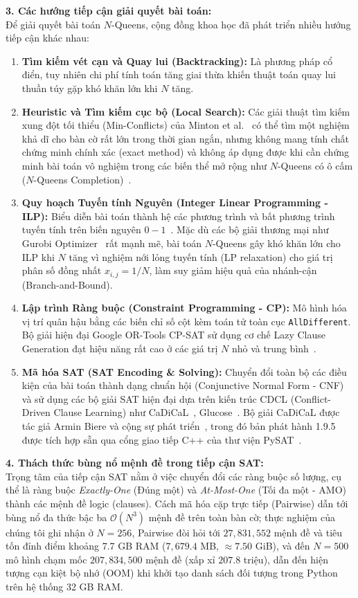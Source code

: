 \documentclass[a4paper,fleqn]{cas-sc}
\begin{document}
\noindent\textbf{3. Các hướng tiếp cận giải quyết bài toán:}\\
Để giải quyết bài toán $N$-Queens, cộng đồng khoa học đã phát triển nhiều hướng tiếp cận khác nhau:
\begin{enumerate}
    \item \textbf{Tìm kiếm vét cạn và Quay lui (Backtracking):} Là phương pháp cổ điển, tuy nhiên chi phí tính toán tăng giai thừa khiến thuật toán quay lui thuần túy gặp khó khăn lớn khi $N$ tăng.
    \item \textbf{Heuristic và Tìm kiếm cục bộ (Local Search):} Các giải thuật tìm kiếm xung đột tối thiểu (Min-Conflicts) của Minton et al.~\cite{minton1992solving} có thể tìm một nghiệm khả dĩ cho bàn cờ rất lớn trong thời gian ngắn, nhưng không mang tính chất chứng minh chính xác (exact method) và không áp dụng được khi cần chứng minh bài toán vô nghiệm trong các biến thể mở rộng như $N$-Queens có ô cấm ($N$-Queens Completion)~\cite{gent2017complexity}.
    \item \textbf{Quy hoạch Tuyến tính Nguyên (Integer Linear Programming - ILP):} Biểu diễn bài toán thành hệ các phương trình và bất phương trình tuyến tính trên biến nguyên $0-1$~\cite{wolsey2020integer}. Mặc dù các bộ giải thương mại như Gurobi Optimizer~\cite{gurobi} rất mạnh mẽ, bài toán $N$-Queens gây khó khăn lớn cho ILP khi $N$ tăng vì nghiệm nới lỏng tuyến tính (LP relaxation) cho giá trị phân số đồng nhất $x_{i,j} = 1/N$, làm suy giảm hiệu quả của nhánh-cận (Branch-and-Bound).
    \item \textbf{Lập trình Ràng buộc (Constraint Programming - CP):} Mô hình hóa vị trí quân hậu bằng các biến chỉ số cột kèm toán tử toàn cục \texttt{AllDifferent}. Bộ giải hiện đại Google OR-Tools CP-SAT sử dụng cơ chế Lazy Clause Generation đạt hiệu năng rất cao ở các giá trị $N$ nhỏ và trung bình~\cite{ortools}.
    \item \textbf{Mã hóa SAT (SAT Encoding \& Solving):} Chuyển đổi toàn bộ các điều kiện của bài toán thành dạng chuẩn hội (Conjunctive Normal Form - CNF) và sử dụng các bộ giải SAT hiện đại dựa trên kiến trúc CDCL (Conflict-Driven Clause Learning) như CaDiCaL~\cite{biere2024cadical}, Glucose~\cite{audemard2018glucose}. Bộ giải CaDiCaL được tác giả Armin Biere và cộng sự phát triển~\cite{biere2024cadical}, trong đó bản phát hành 1.9.5 được tích hợp sẵn qua cổng giao tiếp C++ của thư viện PySAT~\cite{ignatiev2018pysat}.
\end{enumerate}

\noindent\textbf{4. Thách thức bùng nổ mệnh đề trong tiếp cận SAT:}\\
Trọng tâm của tiếp cận SAT nằm ở việc chuyển đổi các ràng buộc số lượng, cụ thể là ràng buộc \textit{Exactly-One} (Đúng một) và \textit{At-Most-One} (Tối đa một - AMO) thành các mệnh đề logic (clauses). Cách mã hóa cặp trực tiếp (Pairwise) dẫn tới bùng nổ đa thức bậc ba $\mathcal{O}(N^3)$ mệnh đề trên toàn bàn cờ; thực nghiệm của chúng tôi ghi nhận ở $N=256$, Pairwise đòi hỏi tới $27{,}831{,}552$ mệnh đề và tiêu tốn đỉnh điểm khoảng 7.7 GB RAM ($7{,}679.4$ MB, $\approx 7.50$ GiB), và đến $N=500$ mô hình chạm mốc $207{,}834{,}500$ mệnh đề (xấp xỉ $207.8$ triệu), dẫn đến hiện tượng cạn kiệt bộ nhớ (OOM) khi khởi tạo danh sách đối tượng trong Python trên hệ thống 32 GB RAM.
\end{document}
